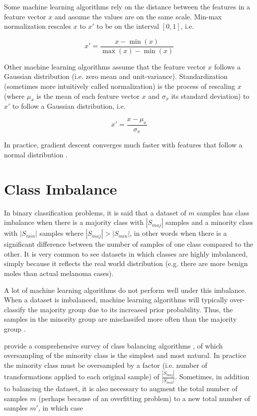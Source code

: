 Some machine learning algorithms rely on the distance between the features in a feature vector $x$ and assume the values are on the same scale. Min-max normalization rescales $x$ to $x'$ to be on the interval $[0, 1]$, i.e.

$$
x' = \frac{x - \min{(x)}}{\max{(x)} - \min{(x)}}
$$

Other machine learning algorithms assume that the feature vector $x$ follows a Gaussian distribution (i.e. zero mean and unit-variance). Standardization (sometimes more intuitively called normalization) is the process of rescaling $x$ (where $\mu_x$ is the mean of each feature vector $x$ and $\sigma_x$ its standard deviation) to $x'$ to follow a Gaussian distribution, i.e.

$$
x' = \frac{x - \mu_x}{\sigma_x}
$$

In practice, gradient descent converges much faster with features that follow a normal distribution \cite{batchnormalization}.

\section{Class Imbalance}
\label{subsection:classimbalance}

In binary classification problems, it is said that a dataset of $m$ samples has class imbalance when there is a majority class with $|S_{maj}|$ samples and a minority class with $|S_{min}|$ samples where $|S_{maj}| > |S_{min}|$, in other words when there is a significant difference between the number of samples of one class compared to the other. It is very common to see datasets in which classes are highly imbalanced, simply because it reflects the real world distribution (e.g. there are more benign moles than actual melanoma cases).

A lot of machine learning algorithms do not perform well under this imbalance. When a dataset is imbalanced, machine learning algorithms will typically over-classify the majority group due to its increased prior probability. Thus, the samples in the minority group are misclassifed more often than the majority group \cite{Johnson2019}.

\citeauthor{haibo2009} provide a comprehensive survey of class balancing algorithms \cite{haibo2009}, of which oversampling of the minority class is the simplest and most natural. In practice the minority class must be oversampled by a factor (i.e. number of transformations applied to each original sample) of $\frac{|S_{maj}|}{|S_{min}|}$. Sometimes, in addition to balancing the dataset, it is also necessary to augment the total number of samples $m$ (perhaps because of an overfitting problem) to a new total number of samples $m'$, in which case

